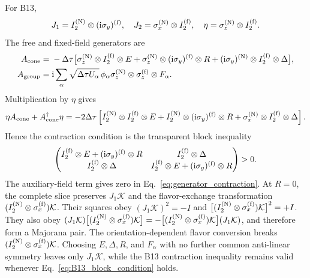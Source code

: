 \documentclass[onecolumn,aps,prb,amsmath,amssymb,superscriptaddress,longbibliography,floatfix]{revtex4-2}
\newcommand{\ii}{\mathrm{i}}
\newcommand{\mc}[1]{\mathcal{#1}}
\begin{document}
For B13,
\begin{equation}
J_1=I_2^{({\rm N})}\otimes(\ii\sigma_y)^{({\rm f})},\quad
J_2=\sigma_x^{({\rm N})}\otimes I_2^{({\rm f})},\quad
\eta=\sigma_z^{({\rm N})}\otimes I_2^{({\rm f})}.
\end{equation}
The free and fixed-field generators are
\begin{align}
A_{\rm cone}={}&-\Delta\tau\bigl[
\sigma_z^{({\rm N})}\otimes I_2^{({\rm f})}\otimes E
+\sigma_z^{({\rm N})}\otimes(\ii\sigma_y)^{({\rm f})}\otimes R
+(\ii\sigma_y)^{({\rm N})}\otimes I_2^{({\rm f})}\otimes\Delta\bigr],\notag\\*
A_{\rm group}={}&\ii\sum_\alpha\sqrt{\Delta\tau U_\alpha}\,\phi_\alpha
\sigma_z^{({\rm N})}\otimes\sigma_z^{({\rm f})}\otimes F_\alpha.
\label{eq:B13_slices}
\end{align}
Multiplication by \(\eta\) gives
\begin{equation}
\eta A_{\rm cone}+A_{\rm cone}^\dagger\eta
=-2\Delta\tau
\left[I_2^{({\rm N})}\otimes I_2^{({\rm f})}\otimes E
+I_2^{({\rm N})}\otimes(\ii\sigma_y)^{({\rm f})}\otimes R
+\sigma_x^{({\rm N})}\otimes I_2^{({\rm f})}\otimes\Delta\right].
\label{eq:B13_contraction}
\end{equation}
Hence the contraction condition is the transparent block inequality
\begin{equation}
\begin{pmatrix}
I_2^{({\rm f})}\otimes E+(\ii\sigma_y)^{({\rm f})}\otimes R
&I_2^{({\rm f})}\otimes\Delta\\
I_2^{({\rm f})}\otimes\Delta
&I_2^{({\rm f})}\otimes E+(\ii\sigma_y)^{({\rm f})}\otimes R
\end{pmatrix}>0.
\label{eq:B13_block_condition}
\end{equation}
The auxiliary-field term gives zero in Eq.~\eqref{eq:generator_contraction}.  At \(R=0\), the complete slice preserves \(J_1\mc K\) and the flavor-exchange transformation \((I_2^{({\rm N})}\otimes\sigma_x^{({\rm f})})\mc K\).  Their squares obey \((J_1\mc K)^2=-I\) and \(\bigl[(I_2^{({\rm N})}\otimes\sigma_x^{({\rm f})})\mc K\bigr]^2=+I\).  They also obey \((J_1\mc K)\bigl[(I_2^{({\rm N})}\otimes\sigma_x^{({\rm f})})\mc K\bigr]=-\bigl[(I_2^{({\rm N})}\otimes\sigma_x^{({\rm f})})\mc K\bigr](J_1\mc K)\), and therefore form a Majorana pair.  The orientation-dependent flavor conversion breaks \((I_2^{({\rm N})}\otimes\sigma_x^{({\rm f})})\mc K\).  Choosing \(E,\Delta,R\), and \(F_\alpha\) with no further common anti-linear symmetry leaves only \(J_1\mc K\), while the B13 contraction inequality remains valid whenever Eq.~\eqref{eq:B13_block_condition} holds.
\end{document}
